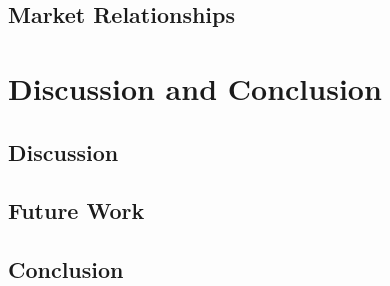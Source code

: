 \documentclass{pdfmx4020}
\begin{document}
  \section{Market Relationships} %
  \label{sec:market_relationships}
  


\chapter{Discussion and Conclusion}

  \section{Discussion} %
  \label{sec:discussion}
  

  \section{Future Work} %
  \label{sec:future_work}
  

  \section{Conclusion} %
  \label{sec:conclusion}
  






\end{document}
